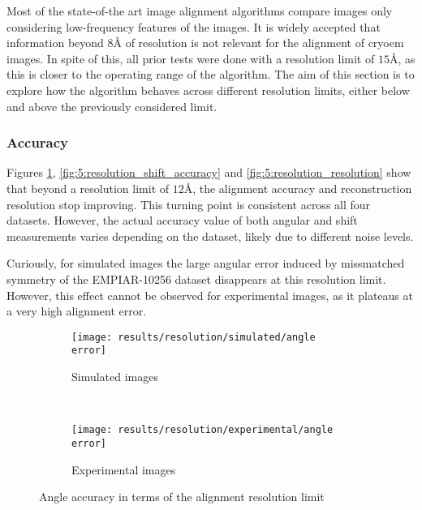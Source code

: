 \documentclass[../main.tex]{subfiles}
\begin{document}
Most of the state-of-the art image alignment algorithms compare images only considering low-frequency features of the images. It is widely accepted that information beyond $8 \si{\angstrom}$ of resolution is not relevant for the alignment of \gls{cryoem} images. In spite of this, all prior tests were done with a resolution limit of $15 \si{\angstrom}$, as this is closer to the operating range of the algorithm. The aim of this section is to explore how the algorithm behaves across different resolution limits, either below and above the previously considered limit.

\subsubsection{Accuracy}
Figures \ref{fig:5:resolution_angle_accuracy}, \ref{fig:5:resolution_shift_accuracy} and \ref{fig:5:resolution_resolution} show that beyond a resolution limit of $12 \si{\angstrom}$, the alignment accuracy and reconstruction resolution stop improving. This turning point is consistent across all four datasets. However, the actual accuracy value of both angular and shift measurements varies depending on the dataset, likely due to different noise levels. 

Curiously, for simulated images the large angular error induced by missmatched symmetry of the EMPIAR-10256 dataset disappears at this resolution limit. However, this effect cannot be observed for experimental images, as it plateaus at a very high alignment error.

\begin{figure}[htbp]
    \centering
    \begin{subfigure}[b]{.8\textwidth}
         \centering
         \texttt{[image: results/resolution/simulated/angle error]}
         \caption{Simulated images}
    \end{subfigure}\\
    \vspace{2em}
    \begin{subfigure}[b]{.8\textwidth}
         \centering
         \texttt{[image: results/resolution/experimental/angle error]}
         \caption{Experimental images}
    \end{subfigure}
    \caption{Angle accuracy in terms of the alignment resolution limit}
    \label{fig:5:resolution_angle_accuracy}
\end{figure}
\end{document}
